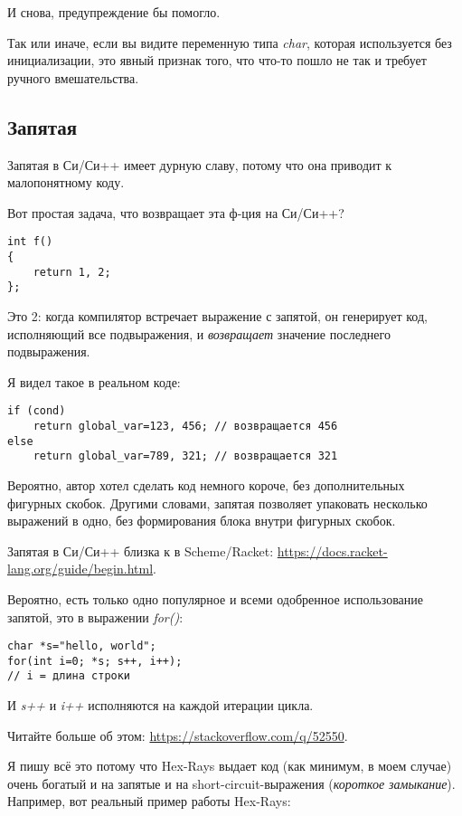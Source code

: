 И снова, предупреждение бы помогло.

Так или иначе, если вы видите переменную типа \emph{char}, которая используется без инициализации, это явный признак того,
что что-то пошло не так и требует ручного вмешательства.

\subsection{Запятая}

Запятая в Си/Си++ имеет дурную славу, потому что она приводит к малопонятному коду.

Вот простая задача, что возвращает эта ф-ция на Си/Си++?

\begin{lstlisting}[style=customc]
int f()
{
	return 1, 2;
};
\end{lstlisting}

Это 2: когда компилятор встречает выражение с запятой, он генерирует код, исполняющий все подвыражения, и \emph{возвращает}
значение последнего подвыражения.

Я видел такое в реальном коде:

\begin{lstlisting}[style=customc]
if (cond)
	return global_var=123, 456; // возвращается 456
else
	return global_var=789, 321; // возвращается 321
\end{lstlisting}

Вероятно, автор хотел сделать код немного короче, без дополнительных фигурных скобок.
Другими словами, запятая позволяет упаковать несколько выражений в одно, без формирования
блока внутри фигурных скобок.

Запятая в Си/Си++ близка к  в Scheme/Racket: \url{https://docs.racket-lang.org/guide/begin.html}.

Вероятно, есть только одно популярное и всеми одобренное использование запятой, это в выражении \emph{for()}:

\begin{lstlisting}[style=customc]
char *s="hello, world";
for(int i=0; *s; s++, i++);
// i = длина строки
\end{lstlisting}

И \emph{s++} и \emph{i++} исполняются на каждой итерации цикла.

Читайте больше об этом: \url{https://stackoverflow.com/q/52550}.

Я пишу всё это потому что Hex-Rays выдает код (как минимум, в моем случае) очень богатый и на запятые и на
short-circuit-выражения (\emph{короткое замыкание}).
Например, вот реальный пример работы Hex-Rays:

